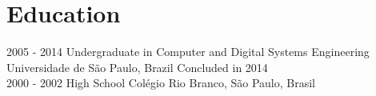 \documentclass[]{friggeri-cv}
\begin{document}
\section{Education}
\begin{entrylist}
  \entry
    {2005 - 2014}
    {Undergraduate in Computer and Digital Systems Engineering\\}
    {Universidade de São Paulo, Brazil}
    {Concluded in 2014\\
    }
  \entry
    {2000 - 2002}
    {High School}
    {Colégio Rio Branco, São Paulo, Brasil}
    {%
    }
\end{entrylist}

\end{document}
